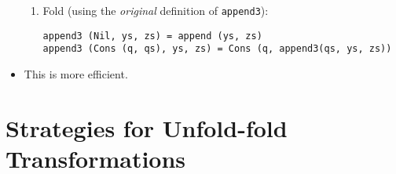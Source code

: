 \begin{itemize}
\begin{enumerate}
\item Fold (using the \emph{original} definition of \texttt{append3}):

\begin{verbatim}
append3 (Nil, ys, zs) = append (ys, zs)
append3 (Cons (q, qs), ys, zs) = Cons (q, append3(qs, ys, zs))
\end{verbatim}

\end{enumerate}

\item This is more efficient.

\end{itemize}

\section{Strategies for Unfold-fold Transformations}

